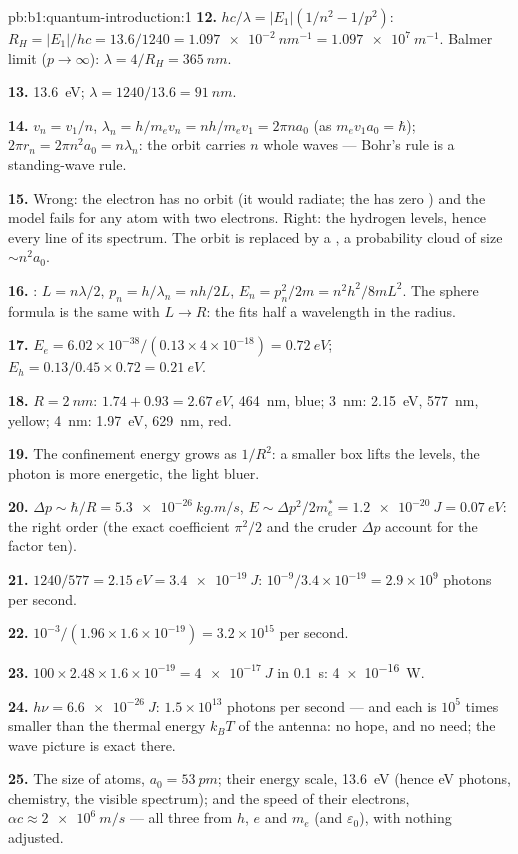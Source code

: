 \begin{solution}{pb:b1:quantum-introduction:1}
\textbf{12.} $hc/\lambda = |E_1|(1/n^2 - 1/p^2)$: $R_H = |E_1|/hc = 13.6/1240 =
\qty{1.097e-2}{nm^{-1}} = \qty{1.097e7}{m^{-1}}$. Balmer limit ($p \to \infty$):
$\lambda = 4/R_H = \qty{365}{nm}$.

\textbf{13.} \qty{13.6}{eV}; $\lambda = 1240/13.6 = \qty{91}{nm}$.

\textbf{14.} $v_n = v_1/n$, $\lambda_n = h/m_ev_n = nh/m_ev_1 = 2\pi na_0$ (as $m_ev_1a_0
= \hbar$); $2\pi r_n = 2\pi n^2a_0 = n\lambda_n$: the orbit carries $n$ whole
waves --- Bohr's rule is a standing-wave rule.

\textbf{15.} Wrong: the electron has no orbit (it would radiate; the
 has zero ) and the model fails for any atom
with two electrons. Right: the hydrogen levels, hence every line of its
spectrum. The orbit is replaced by a , a probability cloud
of size $\sim n^2a_0$.

\textbf{16.} : $L = n\lambda/2$, $p_n = h/\lambda_n = nh/2L$, $E_n =
p_n^2/2m = n^2h^2/8mL^2$. The sphere formula is the same with $L \to R$:
the  fits half a wavelength in the radius.

\textbf{17.} $E_e = 6.02 \times 10^{-38}/(0.13 \times 4 \times 10^{-18}) = \qty{0.72}{eV}$;
$E_h = 0.13/0.45 \times 0.72 = \qty{0.21}{eV}$.

\textbf{18.} $R = \qty{2}{nm}$: $1.74 + 0.93 = \qty{2.67}{eV}$, \qty{464}{nm}, blue;
\qty{3}{nm}: \qty{2.15}{eV}, \qty{577}{nm}, yellow; \qty{4}{nm}: \qty{1.97}{eV},
\qty{629}{nm}, red.

\textbf{19.} The confinement energy grows as $1/R^2$: a smaller box lifts
the levels, the photon is more energetic, the light bluer.

\textbf{20.} $\Delta p \sim \hbar/R = \qty{5.3e-26}{kg.m/s}$, $E \sim \Delta p^2/2m_e^\ast =
\qty{1.2e-20}{J} = \qty{0.07}{eV}$: the right order (the exact coefficient
$\pi^2/2$ and the cruder $\Delta p$ account for the factor ten).

\textbf{21.} $1240/577 = \qty{2.15}{eV} = \qty{3.4e-19}{J}$: $10^{-9}/3.4 \times 10^{-19}
= 2.9 \times 10^9$ photons per second.

\textbf{22.} $10^{-3}/(1.96 \times 1.6 \times 10^{-19}) = 3.2 \times 10^{15}$ per second.

\textbf{23.} $100 \times 2.48 \times 1.6 \times 10^{-19} = \qty{4e-17}{J}$ in \qty{0.1}{s}:
\qty{4e-16}{W}.

\textbf{24.} $h\nu = \qty{6.6e-26}{J}$: $1.5 \times 10^{13}$ photons per second ---
and each is $10^5$ times smaller than the thermal energy $k_BT$ of the
antenna: no hope, and no need; the wave picture is exact there.

\textbf{25.} The size of atoms, $a_0 = \qty{53}{pm}$; their energy scale,
\qty{13.6}{eV} (hence eV photons, chemistry, the visible spectrum); and
the speed of their electrons, $\alpha c \approx \qty{2e6}{m/s}$ --- all three
from $h$, $e$ and $m_e$ (and $\varepsilon_0$), with nothing adjusted.
\end{solution}

